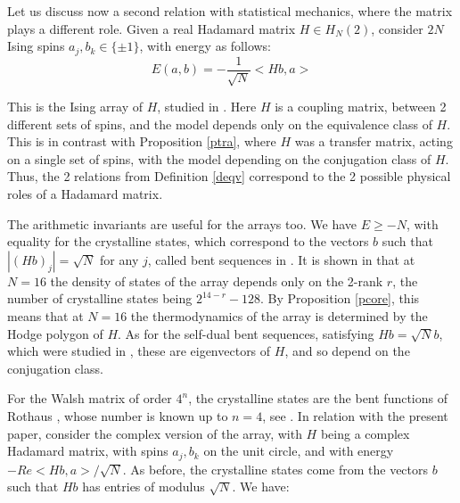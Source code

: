 \documentclass[11pt]{amsart}
\theoremstyle{definition}
\begin{document}
Let us discuss now a second relation with statistical mechanics, where the matrix plays a different role. Given a real Hadamard matrix $H\in H_N(2)$, consider $2N$ Ising spins $a_j,b_k\in\{\pm1\}$, with energy as follows:
$$E(a,b)=-\frac{1}{\sqrt{N}}<Hb,a>$$

This is the Ising array of $H$, studied in \cite{obo}. Here $H$ is a coupling matrix, between 2 different sets of spins, and the model depends only on the equivalence class of $H$. This is in contrast with Proposition \ref{ptra}, where $H$ was a transfer matrix, acting on a single set of spins, with the model depending on the conjugation class of $H$. Thus, the 2 relations from Definition \ref{deqv} correspond to the 2 possible physical roles of a Hadamard matrix.

\medskip

The arithmetic invariants are useful for the arrays too. We have $E\geq-N$, with equality for the crystalline states, which correspond to the vectors $b$ such that $|(Hb)_j|=\sqrt{N}$ for any $j$, called bent sequences in \cite{scg}. It is shown in \cite{obo} that at $N=16$ the density of states of the array depends only on the 2-rank $r$, the number of crystalline states being $2^{14-r}-128$. By Proposition \ref{pcore}, this means that at $N=16$ the thermodynamics of the array is determined by the Hodge polygon of $H$. As for the self-dual bent sequences, satisfying $Hb=\sqrt{N}b$, which were studied in \cite{slc}, these are eigenvectors of $H$, and so depend on the conjugation class.

\medskip

For the Walsh matrix of order $4^n$, the crystalline states are the bent functions of Rothaus \cite{rot}, whose number is known up to $n=4$, see \cite{lle}. In relation with the present paper, consider the complex version of the array, with $H$ being a complex Hadamard matrix, with spins $a_j,b_k$ on the unit circle, and with energy $-Re<Hb,a>/\sqrt{N}$. As before, the crystalline states come from the vectors $b$ such that $Hb$ has entries of modulus $\sqrt{N}$. We have:
\end{document}
